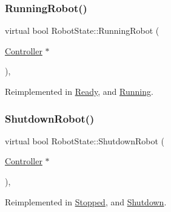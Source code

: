 \mbox{\label{class_robot_state_a34151e935ca2807b89df8ab7f0561487}} 
\subsubsection{\texorpdfstring{RunningRobot()}{RunningRobot()}}
{\footnotesize\ttfamily virtual bool Robot\+State\+::\+Running\+Robot (\begin{DoxyParamCaption}\item[{\mbox{\hyperlink{class_controller}{Controller}} $\ast$}]{ }\end{DoxyParamCaption})\hspace{0.3cm}{\ttfamily [inline]}, {\ttfamily [virtual]}}



Reimplemented in \mbox{\hyperlink{class_ready_a963ef4cb03dacb0b1f31eb4125b7fd68}{Ready}}, and \mbox{\hyperlink{class_running_a61f82d910ea233cff01d7ec1cf00e995}{Running}}.

\mbox{\label{class_robot_state_a9f2cd6a7ec1022e85d6ac160c6f75e54}} 
\subsubsection{\texorpdfstring{ShutdownRobot()}{ShutdownRobot()}}
{\footnotesize\ttfamily virtual bool Robot\+State\+::\+Shutdown\+Robot (\begin{DoxyParamCaption}\item[{\mbox{\hyperlink{class_controller}{Controller}} $\ast$}]{ }\end{DoxyParamCaption})\hspace{0.3cm}{\ttfamily [inline]}, {\ttfamily [virtual]}}



Reimplemented in \mbox{\hyperlink{class_stopped_ab3e25b89de8b1fead0e6faa766b40da0}{Stopped}}, and \mbox{\hyperlink{class_shutdown_ac3e8449d327804a47d82f8d84c3d99b4}{Shutdown}}.

\mbox{\label{class_robot_state_a58fdf53d3f27201879d4dbf7aaef7ca1}} 
